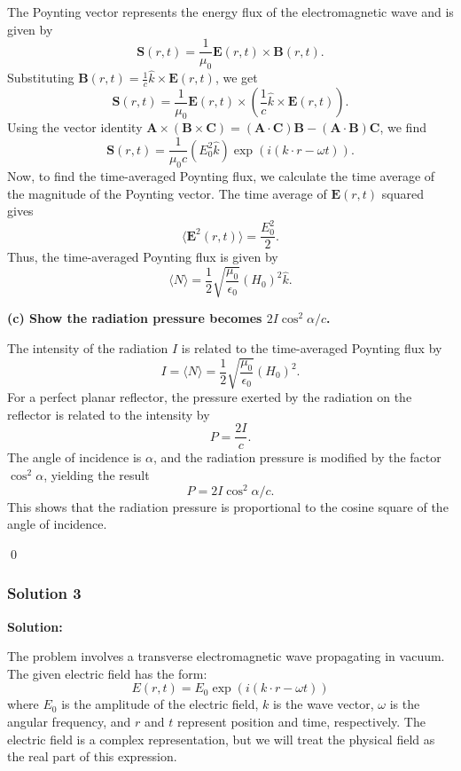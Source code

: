 \documentclass{article}
\begin{document}
The Poynting vector represents the energy flux of the electromagnetic wave and is given by
\[
\mathbf{S}(r, t) = \frac{1}{\mu_0} \mathbf{E}(r, t) \times \mathbf{B}(r, t).
\]
Substituting \(\mathbf{B}(r, t) = \frac{1}{c} \hat{k} \times \mathbf{E}(r, t)\), we get
\[
\mathbf{S}(r, t) = \frac{1}{\mu_0} \mathbf{E}(r, t) \times \left( \frac{1}{c} \hat{k} \times \mathbf{E}(r, t) \right).
\]
Using the vector identity \(\mathbf{A} \times (\mathbf{B} \times \mathbf{C}) = (\mathbf{A} \cdot \mathbf{C}) \mathbf{B} - (\mathbf{A} \cdot \mathbf{B}) \mathbf{C}\), we find
\[
\mathbf{S}(r, t) = \frac{1}{\mu_0 c} \left( E_0^2 \hat{k} \right) \exp(i (k \cdot r - \omega t)).
\]
Now, to find the time-averaged Poynting flux, we calculate the time average of the magnitude of the Poynting vector. The time average of \( \mathbf{E}(r, t) \) squared gives
\[
\langle \mathbf{E}^2(r, t) \rangle = \frac{E_0^2}{2}.
\]
Thus, the time-averaged Poynting flux is given by
\[
\langle N \rangle = \frac{1}{2} \sqrt{\frac{\mu_0}{\epsilon_0}} (H_0)^2 \hat{k}.
\]

\textbf{(c) Show the radiation pressure becomes \(2I \cos^2 \alpha / c\).}

The intensity of the radiation \(I\) is related to the time-averaged Poynting flux by
\[
I = \langle N \rangle = \frac{1}{2} \sqrt{\frac{\mu_0}{\epsilon_0}} (H_0)^2.
\]
For a perfect planar reflector, the pressure exerted by the radiation on the reflector is related to the intensity by
\[
P = \frac{2I}{c}.
\]
The angle of incidence is \(\alpha\), and the radiation pressure is modified by the factor \(\cos^2 \alpha\), yielding the result
\[
P = 2I \cos^2 \alpha / c.
\]
This shows that the radiation pressure is proportional to the cosine square of the angle of incidence.

\qed

\subsubsection{Solution 3}
\textbf{Solution:}

The problem involves a transverse electromagnetic wave propagating in vacuum. The given electric field has the form:
\[
E(r, t) = E_0 \exp(i (k \cdot r - \omega t))
\]
where \( E_0 \) is the amplitude of the electric field, \( k \) is the wave vector, \( \omega \) is the angular frequency, and \( r \) and \( t \) represent position and time, respectively. The electric field is a complex representation, but we will treat the physical field as the real part of this expression.
\end{document}
